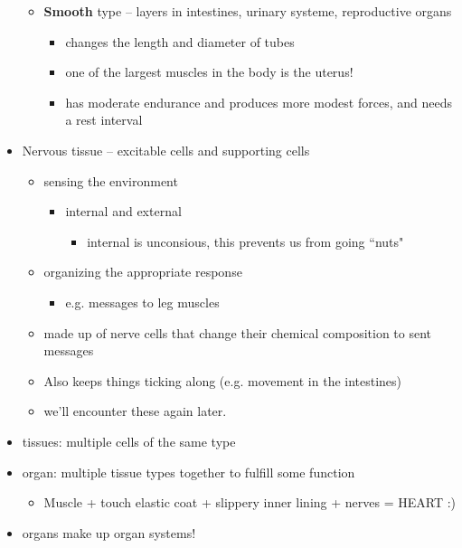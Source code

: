\documentclass{article}
\theoremstyle{definition}
\begin{document}
\begin{itemize}
\begin{itemize}
\begin{itemize}
\begin{itemize}
						\end{itemize}
				\end{itemize}
			\item \textbf{Smooth}  type -- layers in intestines, urinary systeme, reproductive organs
				\begin{itemize}
					\item changes the length and diameter of tubes
					\item one of the largest muscles in the body is the uterus!
					\item has moderate endurance and produces more modest forces, and needs a rest interval
				\end{itemize}
		\end{itemize}
	\item Nervous tissue -- excitable cells and supporting cells
		\begin{itemize}
			\item sensing the environment
				\begin{itemize}
					\item internal and external
						\begin{itemize}
							\item internal is unconsious, this prevents us from going ``nuts"
						\end{itemize}
				\end{itemize}
			\item organizing the appropriate response
				\begin{itemize}
					\item e.g. messages to leg muscles
				\end{itemize}
			\item made up of nerve cells that change their chemical composition to sent messages
			\item Also keeps things ticking along (e.g. movement in the intestines)
			\item we'll encounter these again later.
		\end{itemize}
	\item tissues: multiple cells of the same type
	\item organ: multiple tissue types together to fulfill some function
		\begin{itemize}
			\item Muscle + touch elastic coat + slippery inner lining + nerves = HEART :)
		\end{itemize}
	\item organs make up organ systems!
		\begin{itemize}

\end{itemize}
\end{itemize}
\end{document}
